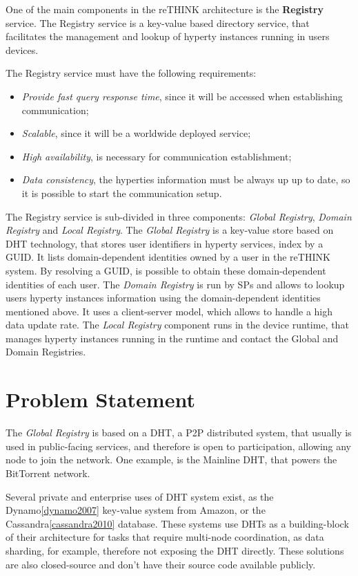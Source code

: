One of the main components in the reTHINK architecture is the \textbf{Registry} service.
The Registry service is a key-value based directory service, that facilitates the management and lookup of hyperty instances running in users devices.

The Registry service must have the following requirements:
\begin{itemize}
	\item \textit{Provide fast query response time}, since it will be accessed when establishing communication;
	\item \textit{Scalable}, since it will be a worldwide deployed service;
	\item \textit{High availability}, is necessary for communication establishment;
	\item \textit{Data consistency}, the hyperties information must be always up up to date, so it is possible to start the communication setup.
\end{itemize}

The Registry service is sub-divided in three components: \textit{Global Registry}, \textit{Domain Registry} and \textit{Local Registry}.
The \textit{Global Registry} is a key-value store based on \ac{DHT} technology, that stores user identifiers in hyperty services, index by a \ac{GUID}.
It lists domain-dependent identities owned by a user in the reTHINK system.
By resolving a \ac{GUID}, is possible to obtain these domain-dependent identities of each user.
The \textit{Domain Registry} is run by \acp{SP} and allows to lookup users hyperty instances information using the domain-dependent identities mentioned above.
It uses a client-server model, which allows to handle a high data update rate.
The \textit{Local Registry} component runs in the device runtime, that manages hyperty instances running in the runtime and contact the Global and Domain Registries.

\section{Problem Statement}
\label{section:problem-statement}

The \textit{Global Registry} is based on a \ac{DHT}, a \ac{P2P} distributed system, that usually is used in public-facing services, and therefore is open to participation, allowing any node to join the network.
One example, is the Mainline \ac{DHT}, that powers the BitTorrent network.

Several private and enterprise uses of DHT system exist, as the Dynamo\ref{dynamo2007} key-value system from Amazon, or the Cassandra\ref{cassandra2010} database.
These systems use \acp{DHT} as a building-block of their architecture for tasks that require multi-node coordination, as data sharding, for example, therefore not exposing the \ac{DHT} directly.
These solutions are also closed-source and don't have their source code available publicly.

